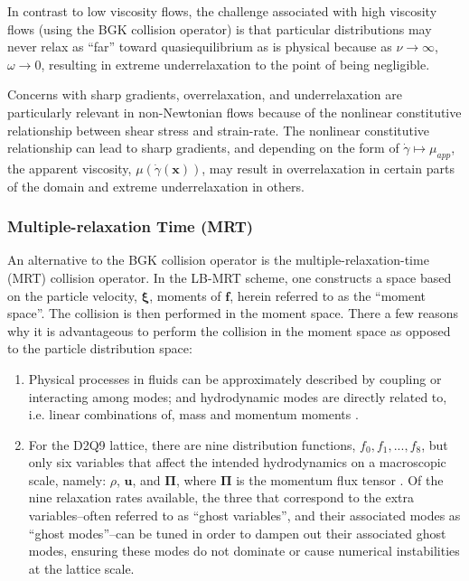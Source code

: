 \documentclass{article}
\newcommand{\pos}{\mathbf{x}}
\newcommand{\pvel}{\boldsymbol{\xi}}
\begin{document}
In contrast to low viscosity flows, the challenge associated with high viscosity flows (using the BGK collision operator) is that particular distributions may never relax as ``far'' toward quasiequilibrium as is physical because as $\nu \rightarrow \infty$, $\omega \rightarrow 0$, resulting in extreme underrelaxation to the point of being negligible. %

Concerns with sharp gradients, overrelaxation, and underrelaxation are particularly relevant in non-Newtonian flows because of the nonlinear constitutive relationship between shear stress and strain-rate.
The nonlinear constitutive relationship can lead to sharp gradients, and depending on the form of $\dot{\gamma} \mapsto \mu_{app}$, the apparent viscosity, $\mu(\dot{\gamma}(\pos))$, may result in overrelaxation in certain parts of the domain and extreme underrelaxation in others.

\subsubsection{Multiple-relaxation Time (MRT)}

An alternative to the BGK collision operator is the multiple-relaxation-time (MRT) collision operator.
In the LB-MRT scheme, one constructs a space based on the particle velocity, $\pvel$, moments of $\mathbf{f}$, herein referred to as the ``moment space''.
The collision is then performed in the moment space.
There a few reasons why it is advantageous to perform the collision in the moment space as opposed to the particle distribution space:
\begin{enumerate}
    \item Physical processes in fluids can be approximately described by coupling or interacting among modes; and hydrodynamic modes are directly related to, i.e. linear combinations of, mass and momentum moments \cite{lallemand2000theory}.
    \item For the D2Q9 lattice, there are nine distribution functions, $f_0, f_1, ..., f_8$, but only six variables that affect the intended hydrodynamics on a macroscopic scale, namely: $\rho$, $\mathbf{u}$, and $\mathbf{\Pi}$, where $\mathbf{\Pi}$ is the momentum flux tensor \cite{dellar2003incompressible}.
    Of the nine relaxation rates available, the three that correspond to the extra variables--often referred to as ``ghost variables'', and their associated modes as ``ghost modes''--can be tuned in order to dampen out their associated ghost modes, ensuring these modes do not dominate or cause numerical instabilities at the lattice scale.
\end{enumerate}
\end{document}
